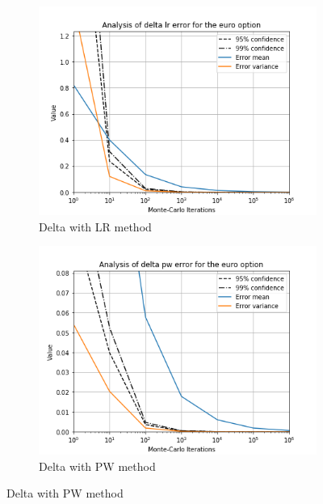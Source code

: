 \documentclass[11pt,a4paper,fleqn]{article}
\begin{document}
\begin{figure}
  \centering
      \begin{subfigure}[b]{0.45\textwidth}
          \includegraphics[width=\textwidth]{graphs/eurodeltalr.png}
          \caption{Delta with LR method}
      \end{subfigure}
      \begin{subfigure}[b]{0.45\textwidth}
          \includegraphics[width=\textwidth]{graphs/eurodeltapw.png}
          \caption{Delta with PW method}
      \end{subfigure}


\end{figure}
\end{document}
